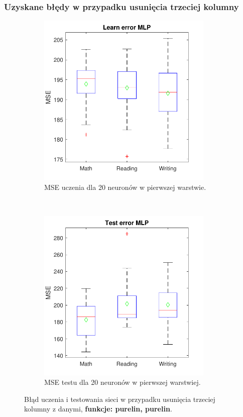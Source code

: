 \documentclass[12pt]{article}
\begin{document}
\subsubsection{Uzyskane błędy w przypadku usunięcia trzeciej kolumny}
\begin{figure}[H]
\centering
\begin{subfigure}[t]{0.48\textwidth} 
\centering
\includegraphics[height=3.3in]{purelin_purelin_20_without_3_learnBoxplot.pdf}
\caption{MSE uczenia dla  20 neuronów w pierwszej warstwie.}
\end{subfigure}
~~
\begin{subfigure}[t]{0.48\textwidth} 
\centering
\includegraphics[height=3.3in]{purelin_purelin_20_without_3_testBoxplot.pdf}
\caption{MSE testu dla  20  neuronów w pierwszej warstwiej.}
\end{subfigure}

\caption{Błąd uczenia i testowania sieci w przypadku usunięcia trzeciej  kolumny z danymi, \textbf{funkcje: purelin, purelin}.}
\end{figure}
\end{document}
